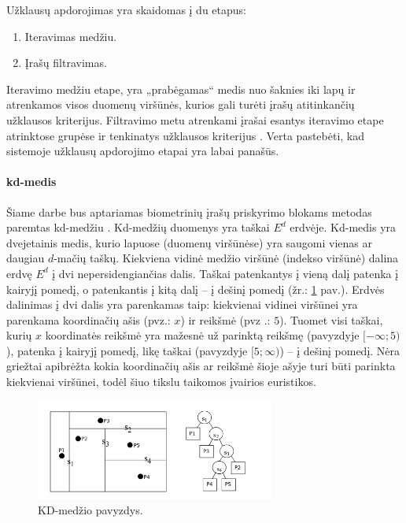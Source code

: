 
Užklausų apdorojimas yra skaidomas į du etapus:
\begin{enumerate}
	\item Iteravimas medžiu.
	\item Įrašų filtravimas.
\end{enumerate}
Iteravimo medžiu etape, yra „prabėgamas“ medis nuo šaknies iki lapų ir atrenkamos visos duomenų viršūnės, kurios gali turėti įrašų atitinkančių užklausos kriterijus.
Filtravimo metu atrenkami įrašai esantys iteravimo etape atrinktose grupėse ir tenkinatys užklausos kriterijus \cite{brinkhoff1994multi} \cite{bohm2001searching}.
Verta pastebėti, kad sistemoje \cite{NeurotechnologyMegamatcherAccelerator} užklausų apdorojimo etapai yra labai panašūs.

\paragraph{kd-medis}

Šiame darbe bus aptariamas biometrinių įrašų priskyrimo blokams metodas paremtas kd-medžiu \cite{bentley1979multidimensional}.
Kd-medžių duomenys yra taškai $E^d$ erdvėje.
Kd-medis yra dvejetainis medis, kurio lapuose (duomenų viršūnėse) yra saugomi vienas ar daugiau $d$-mačių taškų.
Kiekviena vidinė medžio viršūnė (indekso viršūnė) dalina erdvę $E^d$ į dvi nepersidengiančias dalis.
Taškai patenkantys į vieną dalį patenka į kairyjį pomedį, o patenkantis į kitą dalį -- į dešinį pomedį (žr.: \ref{img:KDTreeExample} pav.).
Erdvės dalinimas į dvi dalis yra parenkamas taip: kiekvienai vidinei viršūnei yra parenkama koordinačių ašis (pvz.: $x$) ir reikšmė (pvz .: $5$).
Tuomet visi taškai, kurių $x$ koordinatės reikšmė yra mažesnė už parinktą reikšmę (pavyzdyje $[-\infty; 5)$), patenka į kairyjį pomedį, likę taškai (pavyzdyje $[5; \infty)$) -- į dešinį pomedį.
Nėra griežtai apibrėžta kokia koordinačių ašis ar reikšmė šioje ašyje turi būti parinkta kiekvienai viršūnei, todėl šiuo tikslu taikomos įvairios euristikos.

\begin{figure}[H]
\begin{center}
\includegraphics[width=0.7\textwidth]{img/KDTreeExample.png}
\caption{KD-medžio pavyzdys.}
\label{img:KDTreeExample}
\end{center}
\end{figure}


